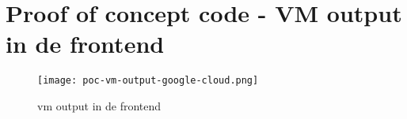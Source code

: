\section{Proof of concept code - VM output in de frontend}\label{appendix:poc-vm-output-google-cloud}
\begin{figure}[hbt!]
  \centering
  \texttt{[image: poc-vm-output-google-cloud.png]}
  \caption{\acrfull{vm} output in de frontend}
  \label{fig:poc-vm-output-google-cloud}
\end{figure}

\newpage